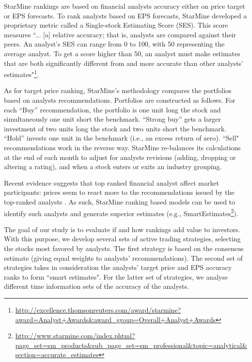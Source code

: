 \documentclass{article}
\begin{document}
StarMine rankings are based on financial analysts accuracy either on price target or EPS forecasts. To rank analysts based on EPS forecasts, StarMine developed a proprietary metric called a Single-stock Estimating Score (SES). This score measures ``... [a] relative accuracy; that is, analysts are compared against their peers. An analyst's SES can range from 0 to 100, with 50 representing the average analyst. To get a score higher than 50, an analyst must make estimates that are both significantly different from and more accurate than other analysts' estimates"\footnote{\url{http://excellence.thomsonreuters.com/award/starmine?award=Analyst+Awards&award_group=Overall+Analyst+Awards}}.


As for target price ranking, StarMine's methodology compares the portfolios based on analysts recommendations. Portfolios are constructed as follows. For each ``Buy'' recommendation, the portfolio is one unit long the stock and simultaneously one unit short the benchmark. ``Strong buy'' gets a larger investment of two units long the stock and two units short the benchmark. ``Hold'' invests one unit in the benchmark (i.e., an excess return of zero). ``Sell" recommendations work in the reverse way. StarMine re-balances its calculations at the end of each month to adjust for analysts revisions (adding, dropping or altering a rating), and when a stock enters or exits an industry grouping.


Recent evidence suggests that top ranked financial analyst affect market participants: prices seem to react more to the recommendations issued by the top-ranked analysts \citep{emery2009}. As such, StarMine ranking based models can be used to identify such analysts and generate superior estimates (e.g., SmartEstimates\footnote{\url{http://www.starmine.com/index.phtml?page_set=sm_products&sub_page_set=sm_professional&topic=analytical&section=accurate_estimates}}).



The goal of our study is to evaluate if and how rankings  add value to investors.  With this purpose, we develop several sets of active trading strategies, selecting the stocks most favored by analysts. The first strategy is based on the consensus estimate (giving equal weights to analysts' recommendations). The second set of strategies takes in consideration the analysts' target price and EPS accuracy ranks to form ``smart estimates". For the latter set of strategies, we analyse different time information sets of the accuracy of the analysts.
\end{document}
